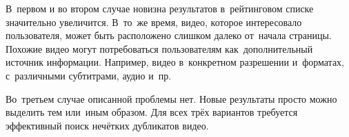 \documentclass{.local/lib/classes/ndvr-super-article-standalone}
\begin{document}
    В~первом и во втором случае новизна результатов
    в~рейтинговом списке значительно увеличится.
    В~то~же время, видео, которое интересовало пользователя,
    может быть расположено слишком далеко от~начала страницы.
    Похожие видео могут потребоваться пользователям как~дополнительный
    источник информации.
    Например, видео в~конкретном разрешении и~форматах,
    с~различными субтитрами, аудио и~пр.  \cite{Cherubini:2009}

    Во~третьем случае описанной проблемы нет.
    Новые результаты просто можно выделить тем или~иным образом.
    Для всех трёх вариантов требуется эффективный поиск
    нечётких дубликатов видео.
\end{document}
